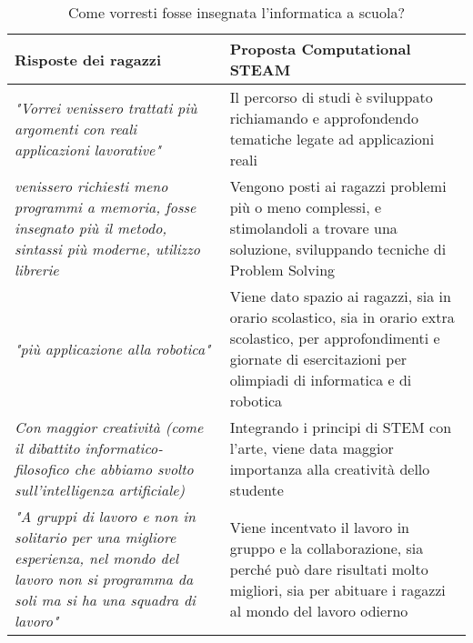 \begin{center}
    \def\arraystretch{1.5}

    \begin{table}[!ht]
        \caption{Come vorresti fosse insegnata l'informatica a scuola?}
        \begin{tabular}{p{} p{}}

            \bfseries{Risposte dei ragazzi} & \bfseries{Proposta Computational STEAM} \\
            \midrule 
            \textit{"Vorrei venissero trattati più argomenti con reali applicazioni lavorative"} & Il percorso di studi è sviluppato richiamando e approfondendo tematiche legate ad applicazioni reali \\
            \midrule
            \textit{venissero richiesti meno programmi a memoria, fosse insegnato più il metodo, sintassi più moderne, utilizzo librerie} & Vengono posti ai ragazzi problemi più o meno complessi, e stimolandoli a trovare una soluzione, sviluppando tecniche di Problem Solving \\
            \midrule
            \textit{"più applicazione alla robotica"} & Viene dato spazio ai ragazzi, sia in orario scolastico, sia in orario extra scolastico, per approfondimenti e giornate di esercitazioni per olimpiadi di informatica e di robotica \\
            \midrule
            \textit{Con maggior creatività (come il dibattito informatico-filosofico che abbiamo svolto sull’intelligenza artificiale)} & Integrando i principi di STEM con l'arte, viene data maggior importanza alla creatività dello studente \\
            \midrule
            \textit{"A gruppi di lavoro e non in solitario per una migliore esperienza, nel mondo del lavoro non si programma da soli ma si ha una squadra di lavoro"} & Viene incentvato il lavoro in gruppo e la collaborazione, sia perché può dare risultati molto migliori, sia per abituare i ragazzi al mondo del lavoro odierno \\


        
        
        \end{tabular}
        \label{table:proposte}
    \end{table}
\end{center}

